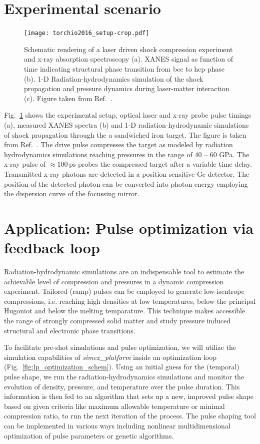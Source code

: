 \documentclass[12pt]{scrartcl}
\begin{document}
\section{Experimental scenario}
\begin{figure}[ht]
  \begin{center}
    \texttt{[image: torchio2016\_setup-crop.pdf]}
  \end{center}
  \caption{Schematic rendering of a laser driven shock compression experiment
  and x-ray absorption spectroscopy (a). XANES signal as function of time
indicating structural phase transition from bcc to hcp phase (b). 1-D
Radiation-hydrodynamics simulation of the shock
propagation and pressure dynamics during laser-matter interaction (c).
Figure taken from Ref.~\cite{Torchio2016}.}
  \label{fig:exp_setup}
\end{figure}
%
Fig.~\ref{fig:exp_setup} shows the experimental setup, optical laser and x-ray
probe pulse timings (a), measured XANES spectra (b) and 1-D radiation-hydrodynamic
simulations of shock propagation through the a sandwiched iron target.
The figure is taken from Ref.~\cite{Torchio2016}. The drive pulse compresses the
target as modeled by radiation hydrodynamics simulations reaching pressures in
the range of 40 -- 60 GPa. The x-ray pulse of $\approx 100\,\text{ps}$ probes
the compressed target after a variable time delay. Transmitted x-ray photons are
detected in a position sensitive Ge detector. The position of the detected
photon can be converted into photon energy employing the dispersion curve of the
focussing mirror.


\section{Application: Pulse optimization via feedback loop}
Radiation-hydrodynamic simulations are an indispensable tool to estimate the
achievable level of compression and pressures in a dynamic compression
experiment. Tailored (ramp) pulses can be employed to generate low-isentrope
compressions, i.e. reaching high densities at low temperatures, below the
principal Hugoniot and below the melting temparature. This technique makes
accessible the range of strongly compressed solid matter and study pressure
induced structural and electronic phase transitions.

To facilitate pre-shot simulations and pulse optimization, we will utilize the
simulation capabilities of \textit{simex\_platform} inside an optimization loop (Fig.~\ref{fig:lp_optimization_schem}).
Using an initial guess for the (temporal) pulse shape, we run the
radiation-hydrodynamics simulations and monitor the evolution of density,
pressure, and temperature over the pulse duration. This information is then fed
to an algorithm that sets up a new, improved pulse shape based on given criteria
like maximum allowable temperature or minimal compression ratio, to run the next
iteration of the process.
The pulse shaping tool can be implemented in various
ways including nonlinear multidimensional optimization of pulse parameters or genetic algorithms.
\end{document}
